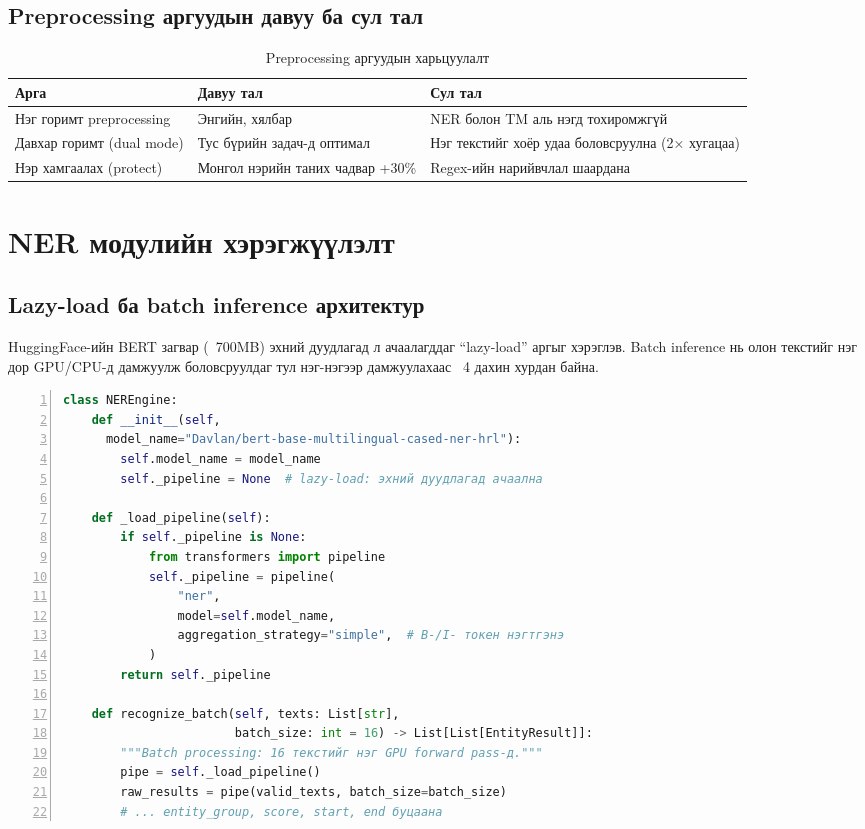 \subsection{Preprocessing аргуудын давуу ба сул тал}

\begin{table}[h!]
\centering
\renewcommand{\arraystretch}{1.4}
\begin{tabular}{|p{3.5cm}|p{5cm}|p{5cm}|}
\hline
\textbf{Арга} & \textbf{Давуу тал} & \textbf{Сул тал} \\ \hline
Нэг горимт preprocessing & Энгийн, хялбар & NER болон TM аль нэгд тохиромжгүй \\ \hline
Давхар горимт (dual mode) & Тус бүрийн задач-д оптимал & Нэг текстийг хоёр удаа боловсруулна (2× хугацаа) \\ \hline
Нэр хамгаалах (protect) & Монгол нэрийн таних чадвар +30\% & Regex-ийн нарийвчлал шаардана \\ \hline
\end{tabular}
\caption{Preprocessing аргуудын харьцуулалт}
\label{tab:preprocessing_comparison}
\end{table}

\section{NER модулийн хэрэгжүүлэлт}

\subsection{Lazy-load ба batch inference архитектур}

HuggingFace-ийн BERT загвар (~700MB) эхний дуудлагад л ачаалагддаг ``lazy-load'' аргыг хэрэглэв. Batch inference нь олон текстийг нэг дор GPU/CPU-д дамжуулж боловсруулдаг тул нэг-нэгээр дамжуулахаас ~4 дахин хурдан байна.

\begin{lstlisting}[language=Python, caption={NEREngine — lazy-load ба batch inference}, basicstyle=\small\ttfamily, breaklines=true, frame=single, numbers=left]
class NEREngine:
    def __init__(self,
      model_name="Davlan/bert-base-multilingual-cased-ner-hrl"):
        self.model_name = model_name
        self._pipeline = None  # lazy-load: эхний дуудлагад ачаална

    def _load_pipeline(self):
        if self._pipeline is None:
            from transformers import pipeline
            self._pipeline = pipeline(
                "ner",
                model=self.model_name,
                aggregation_strategy="simple",  # B-/I- токен нэгтгэнэ
            )
        return self._pipeline

    def recognize_batch(self, texts: List[str],
                        batch_size: int = 16) -> List[List[EntityResult]]:
        """Batch processing: 16 текстийг нэг GPU forward pass-д."""
        pipe = self._load_pipeline()
        raw_results = pipe(valid_texts, batch_size=batch_size)
        # ... entity_group, score, start, end буцаана
\end{lstlisting}

